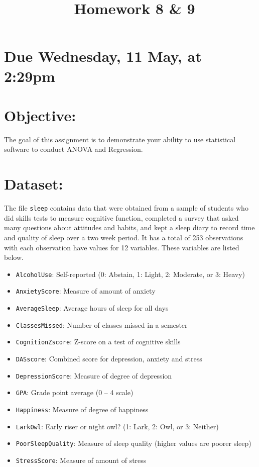 \documentclass[twoside]{tufte-handout}
\author[\semesterinfo]{\semesterinfo}
\date{}  %
\title{\booksection \ Homework 8 \& 9}
\begin{document}
\maketitle%

\section{Due Wednesday, 11 May, at 2:29pm}

\section{Objective:}
\begin{fullwidth}
The goal of this assignment is to demonstrate your ability to use statistical software to conduct ANOVA and Regression.
\end{fullwidth}

\section{Dataset:}
\begin{fullwidth}
The file \texttt{sleep} contains data that were obtained from a sample of students who did skills tests to measure cognitive function, completed a survey that asked many questions about attitudes and habits, and kept a sleep diary to record time and quality of sleep over a two week period.
It has a total of 253 observations with each observation have values for 12 variables.
These variables are listed below.
\begin{itemize}\setlength{\itemsep}{0em}
  \item \texttt{AlcoholUse}: Self-reported (0: Abstain, 1: Light, 2: Moderate, or 3: Heavy)
  \item \texttt{AnxietyScore}: Measure of amount of anxiety
  \item \texttt{AverageSleep}: Average hours of sleep for all days
  \item \texttt{ClassesMissed}: Number of classes missed in a semester
  \item \texttt{CognitionZscore}: Z-score on a test of cognitive skills
  \item \texttt{DASscore}: Combined score for depression, anxiety and stress
  \item \texttt{DepressionScore}: Measure of degree of depression
  \item \texttt{GPA}: Grade point average (0 -- 4 scale)
  \item \texttt{Happiness}: Measure of degree of happiness
  \item \texttt{LarkOwl}: Early riser or night owl? (1: Lark, 2: Owl, or 3: Neither)
  \item \texttt{PoorSleepQuality}: Measure of sleep quality (higher values are poorer sleep)
  \item \texttt{StressScore}: Measure of amount of stress
\end{itemize}
\end{fullwidth}
\end{document}
